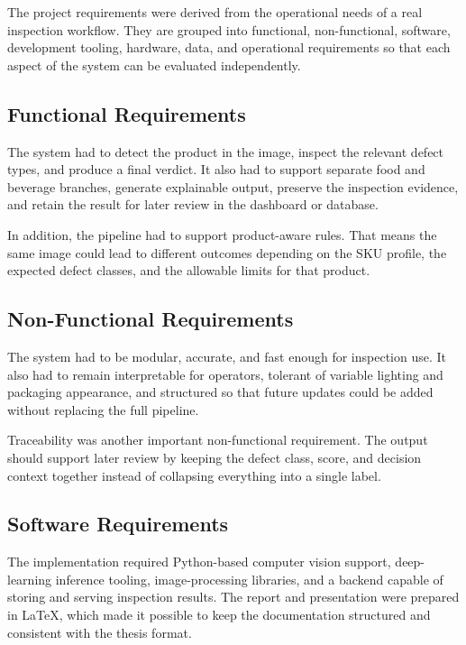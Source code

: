 \documentclass[12pt,a4paper]{report}
\begin{document}
The project requirements were derived from the operational needs of a real inspection workflow. They are grouped into functional, non-functional, software, development tooling, hardware, data, and operational requirements so that each aspect of the system can be evaluated independently.

\subsection{Functional Requirements}
\label{subsec:functional-requirements}

The system had to detect the product in the image, inspect the relevant defect types, and produce a final verdict. It also had to support separate food and beverage branches, generate explainable output, preserve the inspection evidence, and retain the result for later review in the dashboard or database.

In addition, the pipeline had to support product-aware rules. That means the same image could lead to different outcomes depending on the SKU profile, the expected defect classes, and the allowable limits for that product.

\subsection{Non-Functional Requirements}
\label{subsec:non-functional-requirements}

The system had to be modular, accurate, and fast enough for inspection use. It also had to remain interpretable for operators, tolerant of variable lighting and packaging appearance, and structured so that future updates could be added without replacing the full pipeline.

Traceability was another important non-functional requirement. The output should support later review by keeping the defect class, score, and decision context together instead of collapsing everything into a single label.

\subsection{Software Requirements}
\label{subsec:software-requirements}

The implementation required Python-based computer vision support, deep-learning inference tooling, image-processing libraries, and a backend capable of storing and serving inspection results. The report and presentation were prepared in LaTeX, which made it possible to keep the documentation structured and consistent with the thesis format.
\end{document}

